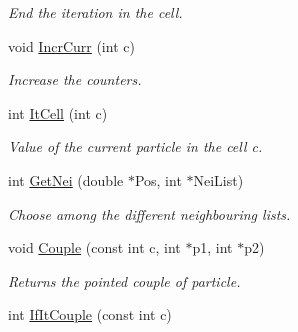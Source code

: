 \begin{DoxyCompactItemize}
\begin{DoxyCompactList}\small\item\em End the iteration in the cell. \end{DoxyCompactList}\item 
void \hyperlink{classDdFixedSize_af5859063d6fe309152f039205b16014e}{Incr\+Curr} (int c)\hypertarget{classDdFixedSize_af5859063d6fe309152f039205b16014e}{}\label{classDdFixedSize_af5859063d6fe309152f039205b16014e}

\begin{DoxyCompactList}\small\item\em Increase the counters. \end{DoxyCompactList}\item 
int \hyperlink{classDdFixedSize_a1fb1ab9e4e4c98b9860711fdb1fba3b4}{It\+Cell} (int c)\hypertarget{classDdFixedSize_a1fb1ab9e4e4c98b9860711fdb1fba3b4}{}\label{classDdFixedSize_a1fb1ab9e4e4c98b9860711fdb1fba3b4}

\begin{DoxyCompactList}\small\item\em Value of the current particle in the cell c. \end{DoxyCompactList}\item 
int \hyperlink{classDdFixedSize_afe0e4e9746cdae570f8c1efdfd04ac16}{Get\+Nei} (double $\ast$Pos, int $\ast$Nei\+List)\hypertarget{classDdFixedSize_afe0e4e9746cdae570f8c1efdfd04ac16}{}\label{classDdFixedSize_afe0e4e9746cdae570f8c1efdfd04ac16}

\begin{DoxyCompactList}\small\item\em Choose among the different neighbouring lists. \end{DoxyCompactList}\item 
void \hyperlink{classDdFixedSize_aabccb7f79ac6e104734750f00fa72b76}{Couple} (const int c, int $\ast$p1, int $\ast$p2)\hypertarget{classDdFixedSize_aabccb7f79ac6e104734750f00fa72b76}{}\label{classDdFixedSize_aabccb7f79ac6e104734750f00fa72b76}

\begin{DoxyCompactList}\small\item\em Returns the pointed couple of particle. \end{DoxyCompactList}\item 
int \hyperlink{classDdFixedSize_a3896db13faf370f18b2a70c6acd01930}{If\+It\+Couple} (const int c)\hypertarget{classDdFixedSize_a3896db13faf370f18b2a70c6acd01930}{}\label{classDdFixedSize_a3896db13faf370f18b2a70c6acd01930}


\end{DoxyCompactItemize}
